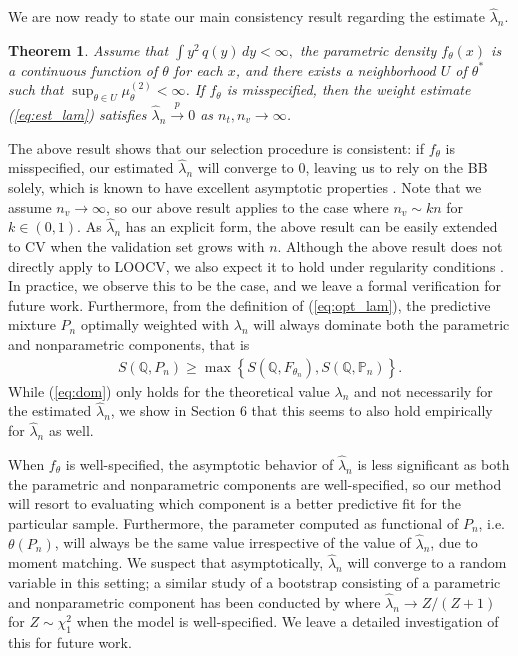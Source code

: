 \documentclass[11pt,a4paper]{article}
\theoremstyle{plain}
\newtheorem{theorem}{Theorem}
\theoremstyle{remark}
\theoremstyle{remark}
\begin{document}
We are now ready to state our main consistency result regarding the estimate $\widehat{\lambda}_n$.

\begin{theorem} \label{theo:optimal} 
Assume that $\int y^2 \,q(y) \,dy<\infty,$ the parametric density $f_{\theta}(x)$ is a continuous function of $\theta$ for each $x$, and there exists a neighborhood $U$ of $\theta^*$ such that $\sup_{\theta \in U}\mu_\theta^{(2)} < \infty$. If $f_\theta$ is misspecified, then the weight estimate (\ref{eq:est_lam}) satisfies $\widehat{\lambda}_n\overset{p}\to 0$ as $n_t, n_v \to \infty$.  
\end{theorem}

The above result shows that our selection procedure is consistent: if $f_\theta$ is misspecified, our estimated $\widehat{\lambda}_n$ will converge to 0, leaving us to rely on the BB solely, which is known to have excellent asymptotic properties \citep{Lyddon2018}. Note that we assume $n_v \to \infty$, so our above result applies to the case where $n_v \sim kn$ for $k \in (0,1)$. As $\widehat{\lambda}_n$ has an explicit form, the above result can be easily extended to CV when the validation set grows with $n$. Although the above result does not directly apply to LOOCV, we also expect it to hold under regularity conditions \citep{arlot2010survey}. In practice, we observe this to be the case, and we leave a formal verification for future work. Furthermore, from the definition of (\ref{eq:opt_lam}), the  predictive mixture $P_n$ optimally weighted with $\lambda_n$ will always dominate both the parametric and nonparametric components, that is 
\begin{align}\label{eq:dom}
   S(\mathbb{Q},P_n)\geq \max\left\{S(\mathbb{Q},F_{\theta_n}),S(\mathbb{Q},\mathbb{P}_n)\right\}.
\end{align}
While (\ref{eq:dom}) only holds for the theoretical value $\lambda_n$ and not necessarily for the estimated $\widehat{\lambda}_n$, we show in Section 6 that this seems to also hold empirically for $\widehat{\lambda}_n$ as well.

When $f_\theta$ is well-specified, the asymptotic behavior of  $\widehat{\lambda}_n$ is less significant as both the parametric and nonparametric components are well-specified, so our method will resort to evaluating which component is a better predictive fit for the particular sample. Furthermore, the parameter computed as functional of $P_n$, i.e. $\theta(P_n)$, will always be the same value irrespective of the value of $\widehat{\lambda}_n$, due to moment matching. We suspect that asymptotically, $\widehat{\lambda}_n$ will converge to a random variable in this setting; a similar study of a bootstrap consisting of a parametric and nonparametric component has been conducted by \cite{lee1994optimal}  where  $\widehat{\lambda}_n\to Z/(Z+1)$ for $Z\sim \chi^2_1$ when the model is well-specified.  We leave a detailed investigation of this for future work.
\end{document}
